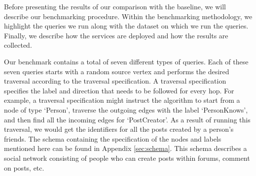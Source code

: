 Before presenting the results of our comparison with the baseline, we will
describe our benchmarking procedure. Within the benchmarking methodology, we
highlight the queries we run along with the dataset on which we run the
queries. Finally, we describe how the services are deployed and how the results
are collected.

\smallskip
Our benchmark contains a total of seven different types of queries. Each of
these seven queries starts with a random source vertex and performs the desired
traversal according to the traversal specification. A traversal specification
specifies the label and direction that needs to be followed for every hop. For
example, a traversal specification might instruct the algorithm to start from a
node of type `Person', traverse the outgoing edges with the label
`PersonKnows', and then find all the incoming edges for `PostCreator'. As a
result of running this traversal, we would get the identifiers for all the posts
created by a person's friends. The schema containing the specification of the
nodes and labels mentioned here can be found in Appendix \ref{sec:schema}. This
schema describes a social network consisting of people who can create posts
within forums, comment on posts, etc. 

